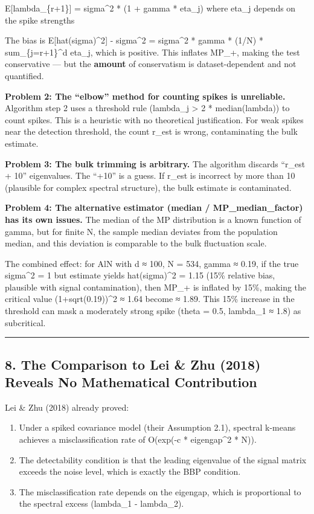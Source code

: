 \documentclass[
  12pt,
]{article}
\providecommand{\tightlist}{%
  \setlength{\itemsep}{0pt}\setlength{\parskip}{0pt}}
\begin{document}
E{[}lambda\_\{r+1\}{]} = sigma\^{}2 * (1 + gamma * eta\_j) where eta\_j
depends on the spike strengths

The bias is E{[}hat(sigma)\^{}2{]} - sigma\^{}2 = sigma\^{}2 * gamma *
(1/N) * sum\_\{j=r+1\}\^{}d eta\_j, which is positive. This inflates
MP\_+, making the test conservative --- but the \textbf{amount} of
conservatism is dataset-dependent and not quantified.

\textbf{Problem 2: The ``elbow'' method for counting spikes is
unreliable.} Algorithm step 2 uses a threshold rule (lambda\_j
\textgreater{} 2 * median(lambda)) to count spikes. This is a heuristic
with no theoretical justification. For weak spikes near the detection
threshold, the count r\_est is wrong, contaminating the bulk estimate.

\textbf{Problem 3: The bulk trimming is arbitrary.} The algorithm
discards ``r\_est + 10'' eigenvalues. The ``+10'' is a guess. If r\_est
is incorrect by more than 10 (plausible for complex spectral structure),
the bulk estimate is contaminated.

\textbf{Problem 4: The alternative estimator (median /
MP\_median\_factor) has its own issues.} The median of the MP
distribution is a known function of gamma, but for finite N, the sample
median deviates from the population median, and this deviation is
comparable to the bulk fluctuation scale.

The combined effect: for AlN with d ≈ 100, N = 534, gamma ≈ 0.19, if the
true sigma\^{}2 = 1 but estimate yields hat(sigma)\^{}2 = 1.15 (15\%
relative bias, plausible with signal contamination), then MP\_+ is
inflated by 15\%, making the critical value (1+sqrt(0.19))\^{}2 ≈ 1.64
become ≈ 1.89. This 15\% increase in the threshold can mask a moderately
strong spike (theta = 0.5, lambda\_1 ≈ 1.8) as subcritical.

\begin{center}\rule{0.5\linewidth}{0.5pt}\end{center}

\subsection{8. The Comparison to Lei \& Zhu (2018) Reveals No
Mathematical
Contribution}\label{the-comparison-to-lei-zhu-2018-reveals-no-mathematical-contribution}

Lei \& Zhu (2018) already proved:

\begin{enumerate}
\def\labelenumi{\arabic{enumi}.}
\tightlist
\item
  Under a spiked covariance model (their Assumption 2.1), spectral
  k-means achieves a misclassification rate of O(exp(-c * eigengap\^{}2
  * N)).
\item
  The detectability condition is that the leading eigenvalue of the
  signal matrix exceeds the noise level, which is exactly the BBP
  condition.
\item
  The misclassification rate depends on the eigengap, which is
  proportional to the spectral excess (lambda\_1 - lambda\_2).
\end{enumerate}
\end{document}
